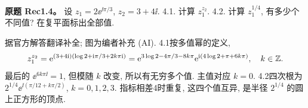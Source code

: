 \begin{exercise}
\textbf{原题 Rec1.4。}\label{ass:rec1-4}
设 $z_1=2\ee^{\ii\pi/3}$, $z_2=3+4\ii$. 4.1. 计算 $z_1^{z_2}$. 4.2. 计算 $z_1^{1/4}$, 有多少个不同值? 在复平面标出全部值.
\end{exercise}
\begin{solution}
据官方解答翻译补全; 图为编者补充 (AI). 4.1按多值幂的定义,
\[
z_1^{z_2}=\mathrm e^{(3+4\mathrm i)(\log2+\mathrm i\pi/3+2k\pi\mathrm i)}
=\mathrm e^{3\log2-4\pi/3-8k\pi}\mathrm e^{\mathrm i(4\log2+\pi+6k\pi)},\quad k\in\mathbb Z.
\]
最后的 $\ee^{6k\pi\ii}=1$, 但模随 $k$ 改变, 所以有无穷多个值. 主值对应 $k=0$. 4.2四次根为 $2^{1/4}\ee^{\ii(\pi/12+k\pi/2)}$, $k=0,1,2,3$. 指标相差4时重复, 这四个值互异, 是半径 $2^{1/4}$ 的圆上正方形的顶点.
\begin{center}
\end{center}
\end{solution}
